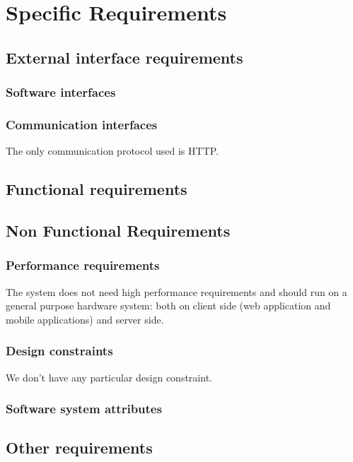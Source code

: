 \chapter{Specific Requirements}


\section{External interface requirements}

\subsection{Software interfaces}
\subsection{Communication interfaces}
The only communication protocol used is HTTP.

\section{Functional requirements}
\section{Non Functional Requirements}
\subsection{Performance requirements}
The system does not need high performance requirements and should run on a general purpose hardware system: both on client side (web application and mobile applications) and server side.
\subsection{Design constraints}
We don't have any particular design constraint.
\subsection{Software system attributes}
\section{Other requirements}